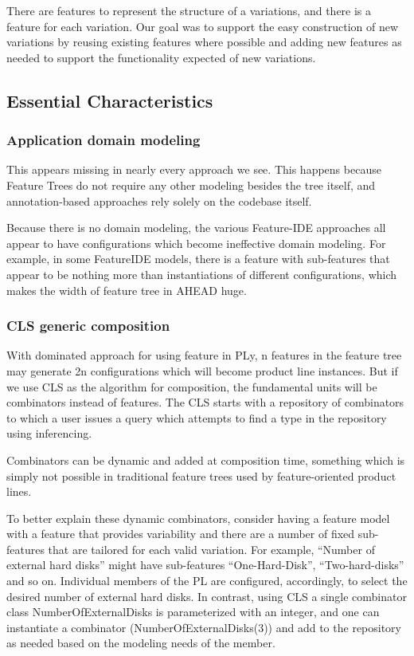 
There are features to represent the structure of a variations, and there is a feature for each variation.
Our goal was to support the easy construction of new variations by reusing existing features where possible
and adding new features as needed to support the functionality expected of new variations.


\subsection{Essential Characteristics}

\subsubsection{Application domain modeling}

This appears missing in nearly every approach we see. This happens because Feature Trees do not require any
other modeling besides the tree itself, and annotation-based approaches rely solely on the codebase itself.

Because there is no domain modeling, the various Feature-IDE approaches all appear to have configurations
which become ineffective domain modeling. For example, in some FeatureIDE models,
there is a feature with sub-features that appear to be nothing more than instantiations of different
configurations, which makes the width of feature tree in AHEAD huge.

\subsubsection{CLS generic composition}

With dominated approach for using feature in PLy, n features in the feature tree may generate 2n configurations
 which will become product line instances. But if we use CLS as the algorithm for composition, the fundamental
 units will be combinators instead of features. The CLS starts with a repository of combinators to which a user
 issues a query which attempts to find a type in the repository using inferencing.

Combinators can be dynamic and added at composition time, something which is simply not possible in traditional
feature trees used by feature-oriented product lines.

To better explain these dynamic combinators, consider having a feature model with a feature that provides
variability and there are a number of fixed sub-features that are tailored for each valid variation.
For example, “Number of external hard disks” might have sub-features “One-Hard-Disk”, “Two-hard-disks” and
so on. Individual members of the PL are configured, accordingly, to select the desired number of external hard
disks. In contrast, using CLS a single combinator class NumberOfExternalDisks is parameterized with an integer,
and one can instantiate a combinator (NumberOfExternalDisks(3)) and add to the repository as needed based on
the modeling needs of the member.

